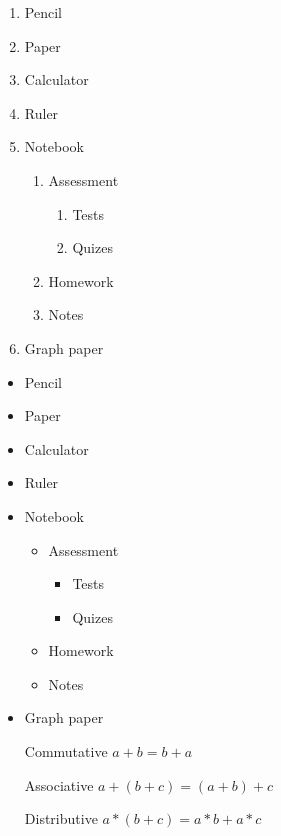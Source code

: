 \documentclass[11pt]{article}
\begin{document}
\begin{enumerate}
\item Pencil
\item Paper
\item Calculator
\item Ruler
\item Notebook
	\begin{enumerate}
	\item Assessment
		\begin{enumerate}
		\item Tests
		\item Quizes
		\end{enumerate}
	\item Homework
	\item Notes
	\end{enumerate}
\item Graph paper
\end{enumerate}

\begin{itemize}
\item Pencil
\item Paper
\item Calculator
\item Ruler
\item Notebook
	\begin{itemize}
	\item Assessment
		\begin{itemize}
		\item Tests
		\item Quizes
		\end{itemize}
	\item Homework
	\item Notes
	\end{itemize}
\item Graph paper
\end{itemize}

\begin{enumerate}
\item[Commutative] $a+b=b+a$
\item[Associative] $a+(b+c)=(a+b)+c$
\item[Distributive] $a*(b+c)=a*b+a*c$
\end{enumerate}
\end{document}
